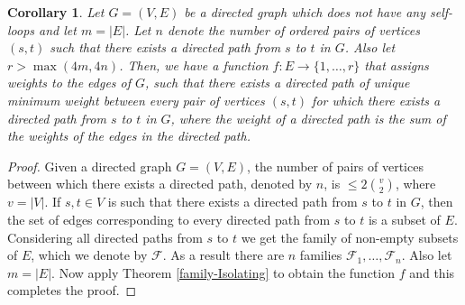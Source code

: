 \documentclass{amsbook}
\newtheorem{corollary}[theorem]{Corollary}
\theoremstyle{definition}
\theoremstyle{remark}
\numberwithin{section}{chapter}
\numberwithin{equation}{chapter}
\newcommand{\F}{\mathcal{F}}
\begin{document}
\begin{corollary}\label{min-unique-family-isolating}
Let $G=(V,E)$ be a directed graph which does not have any self-loops and let $m=|E|$. Let $n$ denote the number of ordered pairs of vertices $(s,t)$ such that there exists a directed path from $s$ to $t$ in $G$. Also let $r>\max (4m,4n)$. Then, we have a function $f:E\rightarrow\{1,\ldots ,r\}$ that assigns weights to the edges of $G$, such that there exists a directed path of unique minimum weight between every pair of vertices $(s,t)$ for which there exists a directed path from $s$ to $t$ in $G$, where the weight of a directed path is the sum of the weights of the edges in the directed path.
\end{corollary}
\begin{proof}
Given a directed graph $G=(V,E)$, the number of pairs of vertices between which there exists a directed path, denoted by $n$, is $\leq 2{{v}\choose {2}}$, where $v=|V|$. If $s,t\in V$ is such that there exists a directed path from $s$ to $t$ in $G$, then the set of edges corresponding to every directed path from $s$ to $t$ is a subset of $E$. Considering all directed paths from $s$ to $t$ we get the family of non-empty subsets of $E$, which we denote by $\F$. As a result there are $n$ families $\F_1,\ldots ,\F _n$. Also let $m=|E|$. Now apply Theorem \ref{family-Isolating} to obtain the function $f$ and this completes the proof.
\end{proof}
\end{document}
